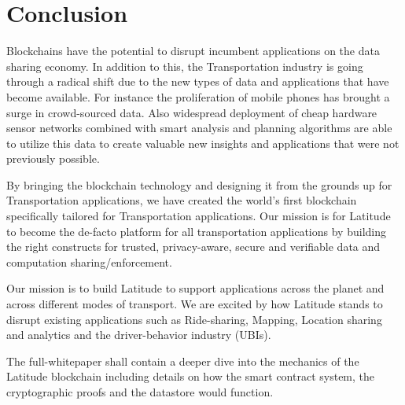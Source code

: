 \section{Conclusion}
\label{sec:conc}

Blockchains have the potential to disrupt incumbent applications on the data sharing economy. In addition to this, the
Transportation industry is going through a radical shift due to the new types of data and applications that have become
available. For instance the proliferation of mobile phones has brought a surge in crowd-sourced data. Also widespread
deployment of cheap hardware sensor networks combined with smart analysis and planning algorithms are able to utilize this
data to create valuable new insights and applications that were not previously possible.

By bringing the blockchain technology and designing it from the grounds up for Transportation applications, we have created
the world's first blockchain specifically tailored for Transportation applications. Our mission is for Latitude to become
the de-facto platform for all transportation applications by building the right constructs for trusted, privacy-aware,
secure and verifiable data and computation sharing/enforcement.

Our mission is to build Latitude to support applications across the planet and across different modes of transport. We
are excited by how Latitude stands to disrupt existing applications such as Ride-sharing, Mapping, Location sharing and
analytics and the driver-behavior industry (UBIs).

The full-whitepaper shall contain a deeper dive into the mechanics of the Latitude blockchain including details on how
the smart contract system, the cryptographic proofs and the datastore would function.

